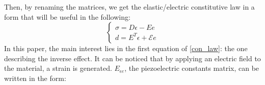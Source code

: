 \documentclass[twocolumn,a4paper,10pt,english]{article}
\begin{document}
            Then, by renaming the matrices, we get the elastic/electric constitutive law in a form that will be useful in the following:
            \begin{equation}
            \begin{cases}
            \sigma = D\epsilon -Ee \\
            d = E^T \epsilon + \mathcal{E} e 
            \end{cases}
            \label{useful_con_law}	
            \end{equation}
            In this paper, the main interest lies in the first equation of \ref{con_law}: the one describing the inverse effect. It can be noticed that by  applying an electric field to the material, a strain is generated.
            $E_{\epsilon e}$, the piezoelectric constants matrix, can be written in the form:
            
\end{document}
